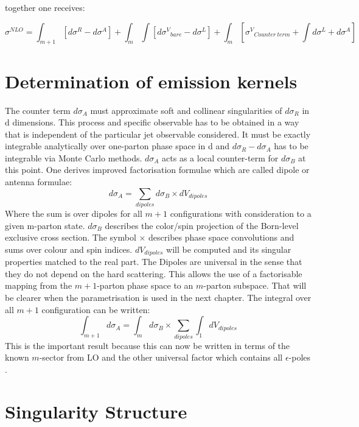 together one receives:

\begin{equation}
\sigma^{NLO} = \int_{m+1} [d \sigma^R -d \sigma^A]+ \int_m \int [ d {\sigma^V}_{bare}- d {\sigma^L}] + \int_m[{\sigma^V}_{Counter\:term}+ \int d {\sigma^L}+d \sigma^A]
\end{equation}

\section*{Determination of emission kernels}
The counter term $ d \sigma_A $ must approximate soft and collinear singularities of $ d \sigma_R $ in d dimensions. This process and specific observable has to be obtained in a way that is independent of the particular jet observable considered. It must be exactly integrable analytically over one-parton phase space in d and $ d \sigma_R -  d \sigma_A  $ has to be integrable via Monte Carlo methods. $ d \sigma_A $ acts as a local counter-term for $ d \sigma_B $ at this point. One derives improved factorisation formulae which are called dipole or antenna formulae:
\begin{equation}
d \sigma_A = \sum_{dipoles} d \sigma_{B} \times d V_{dipoles}
\end{equation}
Where the sum is over dipoles for all $ m+1 $ configurations with consideration to a given m-parton state. $  d \sigma_{B}$ describes the color/spin projection of the Born-level exclusive cross section.
The symbol $ \times $ describes phase space convolutions and sums over colour and spin indices. $ d V_{dipoles} $ will be computed and its singular properties matched to the real part. The Dipoles are universal in the sense that they do not depend on the hard scattering. This allows the use of a factorisable mapping from
the $m + 1$-parton phase space to an $m$-parton subspace. That will be clearer when the parametrisation is used in the next chapter. 
The integral over all $ m+1 $ configuration can be written:
\begin{equation}
\int_{m+1}d \sigma_A =  \int_{m} d \sigma_{B} \times \sum_{dipoles} \int_{1}d V_{dipoles}
\end{equation}
This is the important result because this can now be written in terms of the known $ m $-sector from LO and the other universal factor which contains all $ \epsilon $-poles \cite{Catani:2002hc}.
\section*{Singularity Structure}

